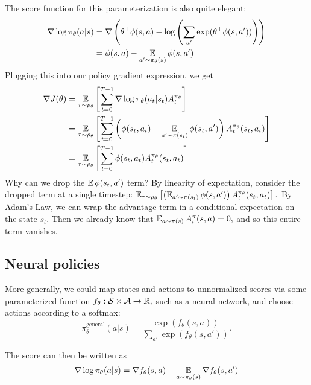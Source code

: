 \documentclass[\main/main]{subfiles}
\begin{document}
The score function for this parameterization is also quite elegant: \begin{equation*}
    \begin{split}
        \nabla \log \pi_\theta(a|s) &= \nabla \left( \theta^\top \phi(s, a) - \log \left( \sum_{a'} \exp(\theta^\top \phi(s, a')) \right) \right) \\
        &= \phi(s, a) - \operatorname*{\mathbb{E}}_{a' \sim \pi_\theta(s)} \phi(s, a')
    \end{split}
\end{equation*}
Plugging this into our policy gradient expression, we get \begin{align*}
    \nabla J(\theta) & = \operatorname*{\mathbb{E}}_{\tau \sim \rho_\theta} \left[
    \sum_{t=0}^{T-1} \nabla \log \pi_\theta(a_t | s_t) A_t^{\pi_\theta}
    \right]                                                                                                                    \\
                     & = \operatorname*{\mathbb{E}}_{\tau \sim \rho_\theta} \left[
    \sum_{t=0}^{T-1} \left( \phi(s_t, a_t) - \operatorname*{\mathbb{E}}_{a' \sim \pi(s_t)} \phi(s_t, a') \right) A_t^{\pi_\theta}(s_t, a_t)
    \right]                                                                                                                    \\
                     & = \operatorname*{\mathbb{E}}_{\tau \sim \rho_\theta} \left[ \sum_{t=0}^{T-1} \phi(s_t, a_t) A_t^{\pi_\theta} (s_t, a_t) \right]
\end{align*}
Why can we drop the $\operatorname*{\mathbb{E}} \phi(s_t, a')$ term? By linearity of expectation, consider the dropped term at a single timestep: $\operatorname*{\mathbb{E}}_{\tau \sim \rho_\theta} \left[ \left( \operatorname*{\mathbb{E}}_{a' \sim \pi(s_t)} \phi(s, a') \right) A_t^{\pi_\theta}(s_t, a_t) \right].$ By Adam's Law, we can wrap the advantage term in a conditional expectation on the state $s_t.$ Then we already know that $\operatorname*{\mathbb{E}}_{a \sim \pi(s)} A_t^{\pi}(s, a) = 0,$ and so this entire term vanishes.

\subsection{Neural policies}

More generally, we could map states and actions to unnormalized scores via some parameterized function $f_\theta : \mathcal{S} \times \mathcal{A} \to \mathbb{R},$ such as a neural network, and choose actions according to a softmax: \[
    \pi^\text{general}_\theta(a|s) = \frac{\exp(f_{\theta}(s,a))}{\sum_{a'} \exp(f_{\theta}(s,a'))}.
\]

The score can then be written as \[
    \nabla \log \pi_\theta(a|s) = \nabla f_\theta(s, a) - \operatorname*{\mathbb{E}}_{a \sim \pi_\theta(s)} \nabla f_\theta (s, a')
\]
\end{document}
